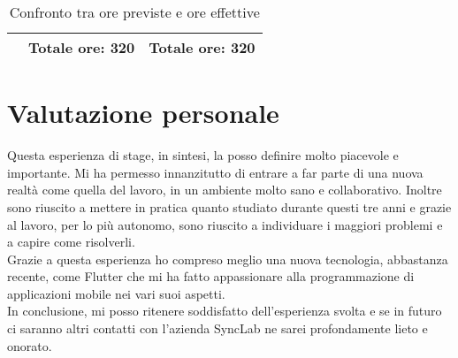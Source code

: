 \begin{center}
\begin{table}[h!]
\begin{tabularx}{\textwidth}{|X|c|c|}
			\hline
			 & \textbf{Totale ore: 320} & \textbf{Totale ore: 320}  \\\hline	
		\end{tabularx}
		\vspace{0.3cm}
		\caption{Confronto tra ore previste e ore effettive}
	\end{table}
\end{center}

\newpage

\section{Valutazione personale}
Questa esperienza di stage, in sintesi, la posso definire molto piacevole e importante.
Mi ha permesso innanzitutto di entrare a far parte di una nuova realtà come quella del lavoro, in un ambiente molto sano e collaborativo.
Inoltre sono riuscito a mettere in pratica quanto studiato durante questi tre anni e grazie al lavoro, per lo più autonomo, sono riuscito a individuare i maggiori problemi e a capire come risolverli.\\
Grazie a questa esperienza ho compreso meglio una nuova tecnologia, abbastanza recente, come Flutter che mi ha fatto appassionare alla programmazione di applicazioni mobile nei vari suoi aspetti.\\
In conclusione, mi posso ritenere soddisfatto dell'esperienza svolta e se in futuro ci saranno altri contatti con l'azienda SyncLab ne sarei profondamente lieto e onorato.


